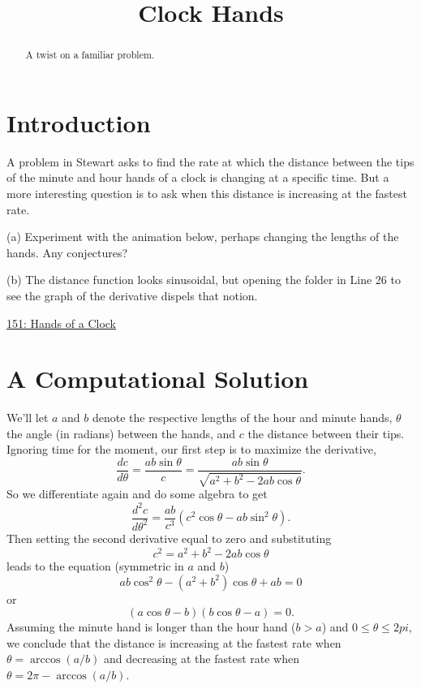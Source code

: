 \documentclass{ximera}
\title{Clock Hands}
\begin{document}
\begin{abstract}
A twist on a familiar problem.
\end{abstract}
\maketitle

\section*{Introduction}
A problem in Stewart asks to find the rate at which the distance between the tips of the minute and hour hands of a clock is changing at a specific time. But a more interesting question is to ask when this distance is increasing at the fastest rate. 


\begin{exploration}
(a) Experiment with the animation below, perhaps changing the lengths of the hands. Any conjectures?

(b) The distance function looks sinusoidal, but opening the folder in Line 26 to see the graph of the derivative dispels that notion. 

\begin{onlineOnly}
    \begin{center}
\end{center}
\end{onlineOnly}

\href{https://www.desmos.com/calculator/zz3qff7ocv}{151: Hands of a Clock}


\end{exploration}

\section*{A Computational Solution}

We'll let $a$ and $b$ denote the respective lengths of the hour and minute hands, $\theta$ the angle (in radians) between the hands, and $c$ the distance between their tips. Ignoring time for the moment, our first step is to maximize the derivative,
\[
        \frac{dc}{d\theta} = \frac{ab\sin \theta}{c} = \frac{ab \sin \theta}{\sqrt{a^2+b^2-2ab\cos\theta}}.
\]
So we differentiate again and do some algebra to get
\[
       \frac{d^2c}{d\theta^2} = \frac{ab}{c^3} \left( c^2\cos\theta - ab\sin^2\theta  \right).
\]
Then setting the second derivative equal to zero and substituting 
\[
      c^2 = a^2+b^2-2ab\cos\theta
\]
leads to the equation (symmetric in $a$ and $b$)
\[
     ab \cos^2\theta - (a^2 + b^2)\cos\theta + ab = 0
\]
or
\[
              (a \cos \theta - b) (b \cos \theta - a) = 0 .
\]
Assuming the minute hand is longer than the hour hand ($b>a$) and $0\leq \theta \leq 2pi$, we conclude that the distance is increasing at the fastest rate when $\theta = \arccos(a/b)$ and decreasing at the fastest rate when $\theta  = 2\pi - \arccos(a/b)$.
\end{document}
